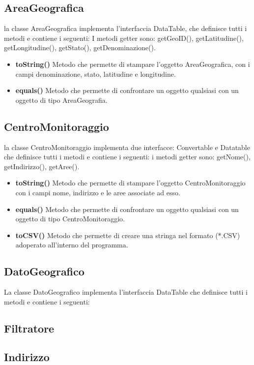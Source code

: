 \documentclass[a4paper, 12pt]{report}
\begin{document}
			\subsection{AreaGeografica}
			la classe AreaGeografica implementa l'interfaccia DataTable, che definisce tutti i metodi e contiene i seguenti:
			I metodi getter sono: getGeoID(), getLatitudine(), getLongitudine(), getStato(), getDenominazione().
			\begin{itemize}
				\item \textbf{toString()}
				Metodo che permette di stampare l'oggetto AreaGeografica, con i campi denominazione, stato, latitudine e longitudine.
				\item \textbf{equals()}
				Metodo che permette di confrontare un oggetto qualsiasi con un oggetto di tipo AreaGeografia.
			\end{itemize}

			\subsection{CentroMonitoraggio}
			la classe CentroMonitoraggio implementa due interfacce: Convertable e Datatable che definisce tutti i metodi e contiene i seguenti:
			i metodi getter sono: getNome(), getIndirizzo(), getAree().
			\begin{itemize}
				\item \textbf{toString()}
				Metodo che permette di stampare l'oggetto CentroMonitoraggio con i campi nome, indirizzo e le aree associate ad esso.
				\item \textbf{equals()}
				Metodo che permette di confrontare un oggetto qualsiasi con un oggetto di tipo CentroMonitoraggio.
				\item \textbf{toCSV()}
				Metodo che permette di creare una stringa nel formato (*.CSV) adoperato all'interno del programma.
			\end{itemize}

			\subsection{DatoGeografico}
			La classe DatoGeografico implementa l'interfaccia DataTable che definisce tutti i metodi e contiene i seguenti:
%
			\subsection{Filtratore}
			\subsection{Indirizzo}
\end{document}
